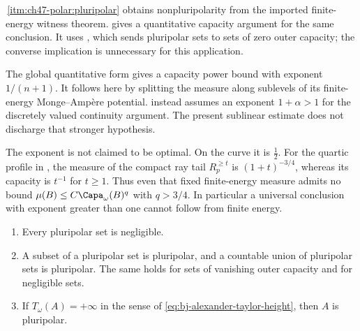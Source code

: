 \begin{remark}
\label{rem:ch48-settles-ch47-polar}
\,\cref{itm:ch47-polar:pluripolar}
obtains nonpluripolarity from the imported finite-energy witness theorem.
 gives a quantitative capacity
argument for the same conclusion.  It uses
, which sends pluripolar sets to
sets of zero outer capacity; the converse implication is unnecessary
for this application.

The global quantitative form gives a capacity power bound with
exponent $1/(n+1)$. It follows here by splitting the measure along
sublevels of its finite-energy Monge--Amp\`ere potential.
 instead assumes an exponent
$1+\alpha>1$ for the discretely valued continuity argument.
The present sublinear estimate does not discharge that stronger
hypothesis.

The exponent is not claimed to be optimal. On the curve it is
$\tfrac12$. For the quartic profile in ,
the measure of the compact ray tail $R_p^{\ge t}$ is
$(1+t)^{-3/4}$, whereas its capacity is $t^{-1}$ for $t\ge1$.
Thus even that fixed finite-energy measure admits no bound
$\mu(B)\le C\Capa_\omega(B)^q$ with $q>3/4$.
In particular a universal conclusion with exponent greater than one
cannot follow from finite energy.

\end{remark}

\begin{proposition}
\label{prop:ch48-pluripolar-negligible}
\begin{enumerate}
\item\label{itm:ch48-pn:neg}
      Every pluripolar set is negligible.
\item\label{itm:ch48-pn:ideal}
      A subset of a pluripolar set is pluripolar, and a countable union of
      pluripolar sets is pluripolar.  The same holds for sets of vanishing
      outer capacity and for negligible sets.
\item\label{itm:ch48-pn:height}
      If $T_\omega(A)=+\infty$ in the sense of
      \eqref{eq:bj-alexander-taylor-height}, then $A$ is pluripolar.
\end{enumerate}
\end{proposition}

